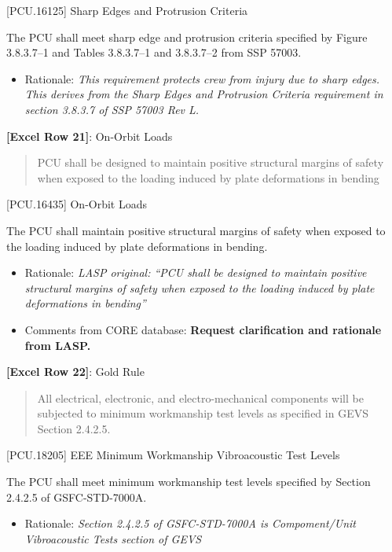 [PCU.16125] Sharp Edges and Protrusion Criteria

The PCU shall meet sharp edge and protrusion criteria specified by Figure 3.8.3.7--1 and Tables 3.8.3.7--1 and 3.8.3.7--2 from SSP 57003.

\begin{itemize}
\item{} Rationale: \emph{This requirement protects crew from injury due to sharp edges. This derives from the Sharp Edges and Protrusion Criteria requirement in section 3.8.3.7 of SSP 57003 Rev L.}

\end{itemize}

\textbf{[Excel Row 21]}: On-Orbit Loads

\begin{quote}
PCU shall be designed to maintain positive structural margins of safety when exposed to the loading induced by plate deformations in bending
\end{quote}

[PCU.16435] On-Orbit Loads

The PCU shall maintain positive structural margins of safety when exposed to the loading induced by plate deformations in bending.

\begin{itemize}
\item{} Rationale: \emph{LASP original: ``PCU shall be designed to maintain positive structural margins of safety when exposed to the loading induced by plate deformations in bending''}

\item{} Comments from CORE database: \textbf{Request clarification and rationale from LASP.}

\end{itemize}

\textbf{[Excel Row 22]}: Gold Rule

\begin{quote}
All electrical, electronic, and electro-mechanical components will be subjected to minimum workmanship test levels as specified in GEVS Section 2.4.2.5.
\end{quote}

[PCU.18205] EEE Minimum Workmanship Vibroacoustic Test Levels

The PCU shall meet minimum workmanship test levels specified by Section 2.4.2.5 of GSFC-STD-7000A.

\begin{itemize}
\item{} Rationale: \emph{Section 2.4.2.5 of GSFC-STD-7000A is Compoment\slash Unit Vibroacoustic Tests section of GEVS}

\end{itemize}

